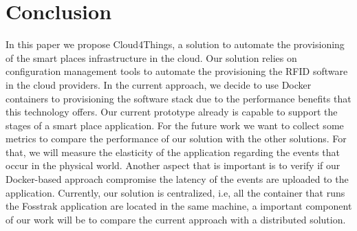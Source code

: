 \section{Conclusion}
\label{sec:conclusion}
In this paper we propose Cloud4Things, a solution to automate the provisioning of the smart places
infrastructure in the cloud. Our solution relies on configuration management tools to automate the
provisioning the RFID software in the cloud providers. In the current approach, we decide to use
Docker containers to provisioning the software stack due to the performance benefits that this
technology offers. Our current prototype already is capable to support the stages of a smart place
application. For the future work we want to collect some metrics to compare the performance of our solution
with the other solutions. For that, we will measure the elasticity of the application regarding the
events that occur in the physical world. Another aspect that is important is to verify if our Docker-based approach
compromise the latency of the events are uploaded to the application. Currently, our solution is centralized, i.e,
all the container that runs the Fosstrak application are located in the same machine, a important component of our
work will be to compare the current approach with a distributed solution.
